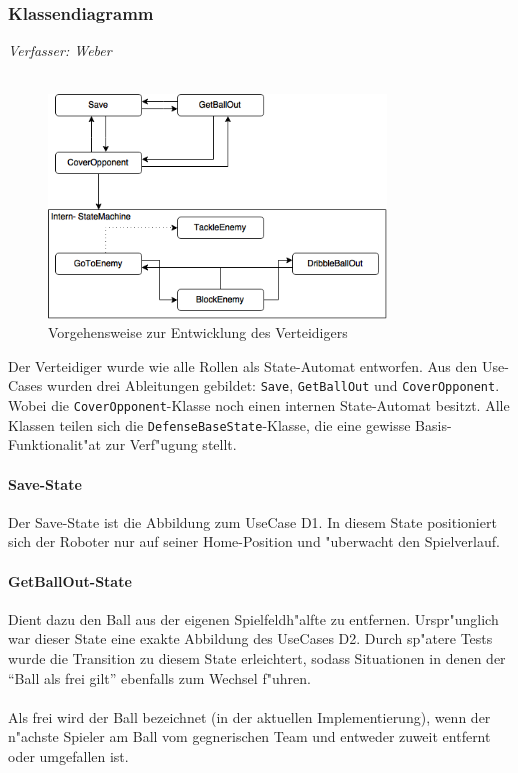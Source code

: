 \subsubsection{Klassendiagramm}
\textit{Verfasser: Weber}\\
\\
\begin{figure}[H]
	\centering
	\includegraphics[width=0.8\textwidth]{Grafiken/KI/defender/defender.png}
	\caption{Vorgehensweise zur Entwicklung des Verteidigers}
\end{figure}

Der Verteidiger wurde wie alle Rollen als State-Automat entworfen. Aus den Use-Cases wurden drei Ableitungen gebildet: \lstinline{Save}, \lstinline{GetBallOut} und \lstinline{CoverOpponent}. Wobei die \lstinline{CoverOpponent}-Klasse noch einen internen State-Automat besitzt. Alle Klassen teilen sich die \lstinline{DefenseBaseState}-Klasse, die eine gewisse Basis-Funktionalit"at zur Verf"ugung stellt.

\paragraph{Save-State}
Der Save-State ist die Abbildung zum UseCase D1. In diesem State positioniert sich der Roboter nur auf seiner Home-Position und "uberwacht den Spielverlauf.

\paragraph{GetBallOut-State}
Dient dazu den Ball aus der eigenen Spielfeldh"alfte zu entfernen. Urspr"unglich war dieser State eine exakte Abbildung des UseCases D2. Durch sp"atere Tests wurde die Transition zu diesem State erleichtert, sodass Situationen in denen der ``Ball als frei gilt'' ebenfalls zum Wechsel f"uhren.\\
\\
Als frei wird der Ball bezeichnet (in der aktuellen Implementierung), wenn der n"achste Spieler am Ball vom gegnerischen Team und entweder zuweit entfernt oder umgefallen ist.

